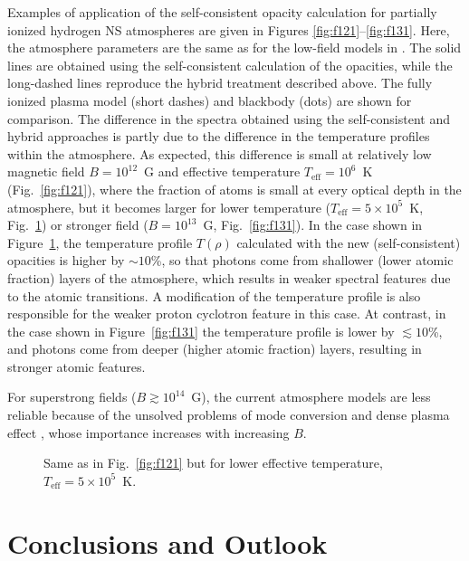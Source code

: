 \documentclass{emulateapj}
\newcommand{\Teff}{T_\mathrm{eff}}
\begin{document}
Examples of application of the self-consistent opacity calculation 
for partially ionized hydrogen NS atmospheres are given in Figures
\ref{fig:f121}--\ref{fig:f131}. Here, the atmosphere parameters are the
same as for the low-field models in \citet{hoetal03}. The solid lines
are obtained using the self-consistent calculation of the opacities,
while the long-dashed lines reproduce the hybrid treatment described above.
The fully ionized plasma model (short dashes) and blackbody (dots) are
shown for comparison. The difference in the spectra obtained using the
self-consistent and hybrid approaches is partly due to the difference
in the temperature profiles within the atmosphere. As
expected, this difference is small at relatively low magnetic field
$B=10^{12}$~G and effective temperature $\Teff=10^6$~K
(Fig.~\ref{fig:f121}), where the fraction of atoms is small at every
optical depth in the atmosphere, but it becomes larger for lower
temperature ($\Teff=5\times10^5$~K, Fig.~\ref{fig:f1255}) or stronger
field ($B=10^{13}$~G, Fig.~\ref{fig:f131}). In the case shown in 
Figure~\ref{fig:f1255}, the temperature profile $T(\rho)$ 
calculated with the new
(self-consistent) opacities is higher by $\sim10$\%, so that photons
come from shallower (lower atomic fraction) layers of the atmosphere, 
which results in weaker spectral features due to the atomic
transitions. A modification of the temperature profile is also
responsible for the weaker proton cyclotron feature in this case. At
contrast, in the case shown in Figure~\ref{fig:f131} the temperature
profile is lower by $\lesssim10$\%, and photons come from deeper (higher
atomic fraction) layers, resulting in stronger atomic features.

For superstrong fields ($B\gtrsim10^{14}$~G), the current atmosphere
models are less reliable because of the unsolved problems of mode
conversion and dense plasma effect \citep[e.g.,][]{hoetal03}, whose
importance increases with increasing $B$.

\begin{figure}
\caption{Same as in Fig.~\protect\ref{fig:f121}
but for lower effective temperature, $\Teff=5\times10^5$~K.
\label{fig:f1255}}
\end{figure}

\section{Conclusions and Outlook}
\label{sect:concl}
\end{document}

